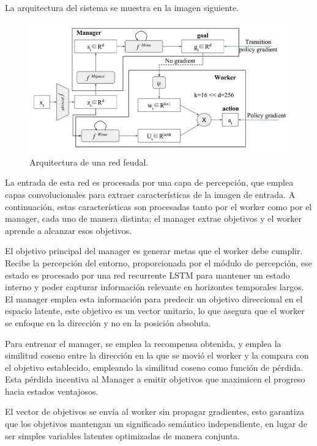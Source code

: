 \documentclass[letterpaper]{article} %
\begin{document}
La arquitectura del sistema se muestra en la imagen siguiente\cite{feudal_networks_2024}.

\begin{figure}[H]
    \centering
    \includegraphics[width=0.9\columnwidth]{feudal_arquitecture.png}
    \caption{Arquitectura de una red feudal.\label{fig:arquitectura_feudal}}
\end{figure}

La entrada de esta red es procesada por una capa de percepción, que emplea capas convolucionales
para extraer características de la imagen de entrada. A continuación, estas características son procesadas
tanto por el worker como por el manager, cada uno de manera distinta; el manager extrae objetivos y el worker
aprende a alcanzar esos objetivos.

El objetivo principal del manager es generar metas que el worker debe cumplir. Recibe la percepción
del entorno, proporcionada por el módulo de percepción, ese estado es procesado por una red recurrente LSTM
para mantener un estado interno y poder capturar información relevante en horizontes temporales largos.
El manager emplea esta información para predecir un objetivo direccional en el espacio latente, este objetivo
es un vector unitario, lo que asegura que el worker se enfoque en la dirección y no en la posición absoluta.

Para entrenar el manager, se emplea la recompensa obtenida, y emplea la similitud coseno entre la dirección en la que 
se movió el worker y la compara con el objetivo establecido, empleando la similitud coseno como función de pérdida.
Esta pérdida incentiva al Manager a emitir objetivos que maximicen el progreso hacia estados ventajosos.

El vector de objetivos se envía al worker sin propagar gradientes, esto garantiza que los objetivos 
mantengan un significado semántico independiente, en lugar de ser simples variables latentes optimizadas de manera conjunta.
\end{document}
